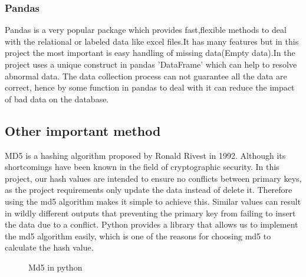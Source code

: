 \documentclass[conference]{IEEEtran}
\begin{document}
\subsubsection{Pandas}
Pandas is a very popular package which provides fast,flexible methods to deal with the relational or labeled data like excel files.It has many features but in this project the most important is easy handling of missing data(Empty data)\cite{b8}.In the project uses a unique construct in pandas 'DataFrame' which can help to resolve abnormal data. The data collection process can not guarantee all the data are correct, hence by some function in pandas to deal with it can reduce the impact of bad data on the database.
\subsection{Other important method}\label{AA}
MD5 is a hashing algorithm proposed by Ronald Rivest in 1992. Although its shortcomings have been known in the field of cryptographic security\cite{b9}. In this project, our hash values are intended to ensure no conflicts between primary keys, as the project requirements only update the data instead of delete it. Therefore using the md5 algorithm makes it simple to achieve this. Similar values can result in wildly different outputs that preventing the primary key from failing to insert the data due to a conflict. Python provides a library that allows us to implement the md5 algorithm easily, which is one of the reasons for choosing md5 to calculate the hash value.
\begin{figure}[htbp]
	\caption{Md5 in python}
	\label{md5}
\end{figure}
\end{document}
